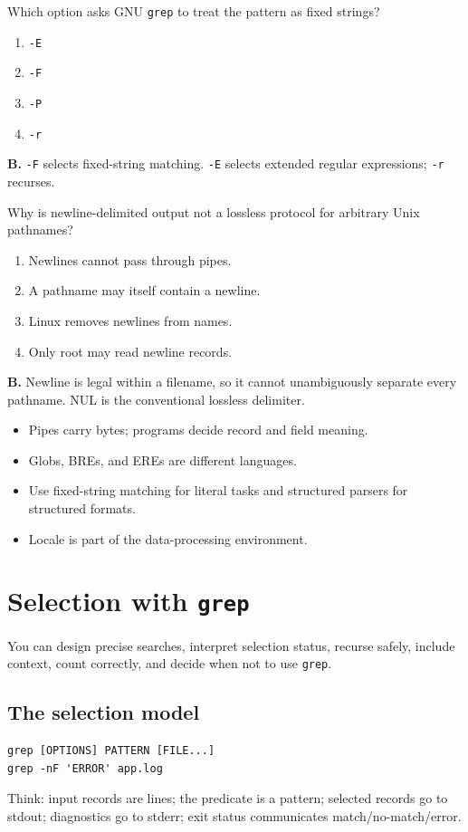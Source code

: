 \documentclass[11pt,oneside,openany]{book}
\newcommand{\fourchoices}[4]{%
  \begin{enumerate}[label=\Alph*),leftmargin=2em,itemsep=0.25em]
    \item #1
    \item #2
    \item #3
    \item #4
  \end{enumerate}}
\newcommand{\chaptergoals}[1]{%
  \begin{tcolorbox}[colback=Paper,colframe=Blue,title={Learning outcomes},fonttitle=\bfseries]
  #1
  \end{tcolorbox}}
\begin{document}
\begin{questionbox}[title={Medium 9.1 -- Literal matching}]
Which option asks GNU \texttt{grep} to treat the pattern as fixed strings?
\fourchoices{\texttt{-E}}{\texttt{-F}}{\texttt{-P}}{\texttt{-r}}
\end{questionbox}
\begin{answerbox}
\textbf{B.} \texttt{-F} selects fixed-string matching. \texttt{-E} selects extended regular expressions; \texttt{-r} recurses.
\end{answerbox}

\begin{questionbox}[title={Hard 9.2 -- Data contract}]
Why is newline-delimited output not a lossless protocol for arbitrary Unix pathnames?
\fourchoices{Newlines cannot pass through pipes.}{A pathname may itself contain a newline.}{Linux removes newlines from names.}{Only root may read newline records.}
\end{questionbox}
\begin{answerbox}
\textbf{B.} Newline is legal within a filename, so it cannot unambiguously separate every pathname. NUL is the conventional lossless delimiter.
\end{answerbox}

\begin{recapbox}
\begin{itemize}
  \item Pipes carry bytes; programs decide record and field meaning.
  \item Globs, BREs, and EREs are different languages.
  \item Use fixed-string matching for literal tasks and structured parsers for structured formats.
  \item Locale is part of the data-processing environment.
\end{itemize}
\end{recapbox}

\chapter{Selection with \texttt{grep}}
\chaptergoals{You can design precise searches, interpret selection status, recurse safely, include context, count correctly, and decide when not to use \texttt{grep}.}

\section{The selection model}
\begin{lstlisting}
grep [OPTIONS] PATTERN [FILE...]
grep -nF 'ERROR' app.log
\end{lstlisting}
Think: input records are lines; the predicate is a pattern; selected records go to stdout; diagnostics go to stderr; exit status communicates match/no-match/error.
\end{document}
